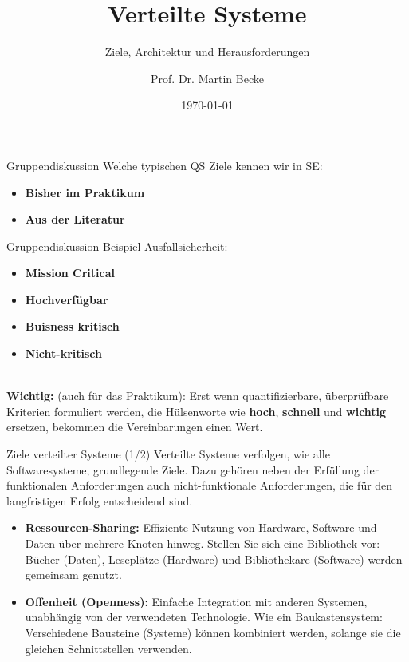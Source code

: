 \documentclass{beamer}
\title{Verteilte Systeme}
\subtitle{Ziele, Architektur und Herausforderungen}
\author{Prof. Dr. Martin Becke}
\date{\today}
\begin{document}
\begin{frame}
    \titlepage
\end{frame}


\begin{frame}{Gruppendiskussion}
    Welche typischen QS Ziele kennen wir in SE:
    \begin{itemize}
        \item \textbf{Bisher im Praktikum} 
        \item \textbf{Aus der Literatur} 
    \end{itemize}
\end{frame}


\begin{frame}{Gruppendiskussion}
    Beispiel Ausfallsicherheit:
    \begin{itemize}
        \item \textbf{Mission Critical} 
        \item \textbf{Hochverfügbar} 
        \item \textbf{Buisness kritisch} 
        \item \textbf{Nicht-kritisch} 
    \end{itemize}
    \mbox{}\\
    \textbf{Wichtig:} (auch für das Praktikum): Erst wenn quantifizierbare, überprüfbare Kriterien formuliert werden, die Hülsenworte wie \textbf{hoch}, \textbf{schnell} und \textbf{wichtig} ersetzen, bekommen die Vereinbarungen einen Wert.
  
   
\end{frame}

\begin{frame}{Ziele verteilter Systeme (1/2)}
    Verteilte Systeme verfolgen, wie alle Softwaresysteme, grundlegende Ziele.  Dazu gehören neben der Erfüllung der funktionalen Anforderungen auch nicht-funktionale Anforderungen, die für den langfristigen Erfolg entscheidend sind.

    \begin{itemize}
        \item \textbf{Ressourcen-Sharing:}  Effiziente Nutzung von Hardware, Software und Daten über mehrere Knoten hinweg. Stellen Sie sich eine Bibliothek vor:  Bücher (Daten), Leseplätze (Hardware) und Bibliothekare (Software) werden gemeinsam genutzt.
        \item \textbf{Offenheit (Openness):} Einfache Integration mit anderen Systemen, unabhängig von der verwendeten Technologie. Wie ein Baukastensystem:  Verschiedene Bausteine (Systeme) können kombiniert werden, solange sie die gleichen Schnittstellen verwenden.
    \end{itemize}
\end{frame}
\end{document}
